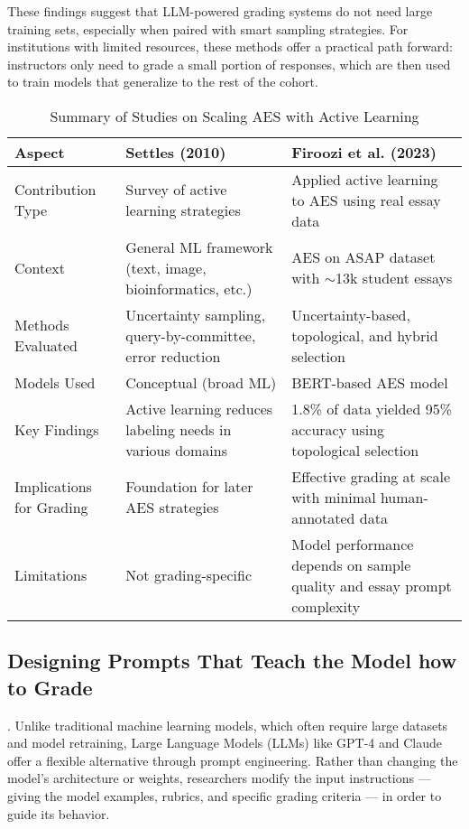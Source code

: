 \documentclass[a4paper,twoside,12pt]{report}
\begin{document}
These findings suggest that LLM-powered grading systems do not need large training sets, especially when paired with smart sampling strategies. For institutions with limited resources, these methods offer a practical path forward: instructors only need to grade a small portion of responses, which are then used to train models that generalize to the rest of the cohort.
\begin{table}[h!]
  \centering
  \begin{tabular}{|p{3.5cm}|p{6.5cm}|p{6.5cm}|}
  \hline
  \textbf{Aspect} & \textbf{Settles (2010)} & \textbf{Firoozi et al. (2023)} \\
  \hline
  Contribution Type & Survey of active learning strategies & Applied active learning to AES using real essay data \\
  \hline
  Context & General ML framework (text, image, bioinformatics, etc.) & AES on ASAP dataset with $\sim$13k student essays \\
  \hline
  Methods Evaluated & Uncertainty sampling, query-by-committee, error reduction & Uncertainty-based, topological, and hybrid selection \\
  \hline
  Models Used & Conceptual (broad ML) & BERT-based AES model \\
  \hline
  Key Findings & Active learning reduces labeling needs in various domains & 1.8\% of data yielded 95\% accuracy using topological selection \\
  \hline
  Implications for Grading & Foundation for later AES strategies & Effective grading at scale with minimal human-annotated data \\
  \hline
  Limitations & Not grading-specific & Model performance depends on sample quality and essay prompt complexity \\
  \hline
  \end{tabular}
  \caption{Summary of Studies on Scaling AES with Active Learning}
  \label{tab:active_learning_aes}
  \end{table}
  
\subsection{Designing Prompts That Teach the Model how to Grade}.
Unlike traditional machine learning models, which often require large datasets and model retraining, Large Language Models (LLMs) like GPT-4 and Claude offer a flexible alternative through prompt engineering. Rather than changing the model’s architecture or weights, researchers modify the input instructions — giving the model examples, rubrics, and specific grading criteria — in order to guide its behavior.
\end{document}
